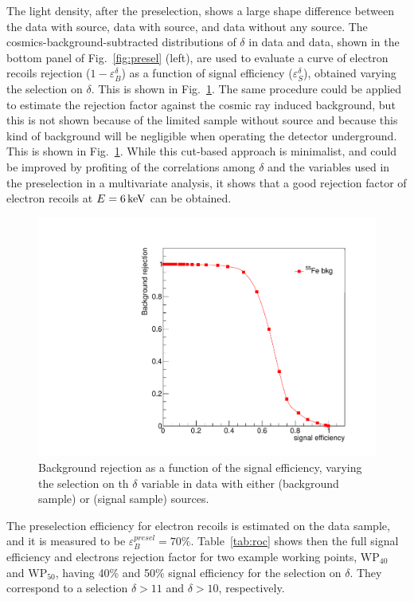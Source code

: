 The light density, after the preselection, shows a large shape
difference between the data with \ambe source, data with \fe source,
and data without any source.  The cosmics-background-subtracted
distributions of $\delta$ in \ambe data and \fe data, shown in the
bottom panel of Fig.~\ref{fig:presel} (left), are used to evaluate a
curve of electron recoils rejection ($1-\varepsilon^\delta_{B}$) as a
function of signal efficiency ($\varepsilon^\delta_{S}$), obtained
varying the selection on $\delta$. This is shown in
Fig.~\ref{fig:roc}. The same procedure could be applied to estimate
the rejection factor against the cosmic ray induced background, but
this is not shown because of the limited sample without source and
because this kind of background will be negligible when operating the
detector underground. This is shown in Fig.~\ref{fig:roc}. While this
cut-based approach is minimalist, and could be improved by profiting
of the correlations among $\delta$ and the variables used in the
preselection in a multivariate analysis, it shows that a good
rejection factor of electron recoils at $E=6\,\textrm{ke\hspace{-.08em}V}$ can be obtained.
%
\begin{figure}[ht]
  \begin{center}
  \includegraphics[width=0.45\linewidth]{figures/density_roc}

  \caption{Background rejection as a function of the signal
    efficiency, varying the selection on th $\delta$ variable in data
    with either \fe (background sample) or \ambe (signal sample)
    sources.  \label{fig:roc}}

  \end{center}
\end{figure}
%

The preselection efficiency for electron recoils is estimated on
the \fe data sample, and it is measured to be
$\varepsilon_{B}^{presel}=70\%$. Table~\ref{tab:roc} shows then the
full signal efficiency and electrons rejection factor for two example
working points, $\mathrm{WP}_{40}$ and $\mathrm{WP}_{50}$, having 40\%
and 50\% signal efficiency for the selection on $\delta$. They
correspond to a selection $\delta>11$ and $\delta>10$, respectively.


